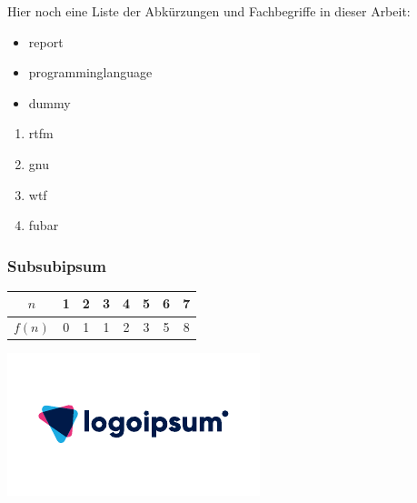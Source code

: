 Hier noch eine Liste der Abkürzungen und Fachbegriffe in dieser Arbeit:

\begin{itemize}
    \item \gls{report}
    \item \gls{programminglanguage}
    \item \gls{dummy}
\end{itemize}

\begin{enumerate}
    \item \acrshort{rtfm}
    \item \acrshort{gnu}
    \item \acrshort{wtf}
    \item \acrshort{fubar}
\end{enumerate}

\lipsum[2-4]

\subsubsection{Subsubipsum}

\begin{table}[h]
    \centering
    \begin{tabular}{c|ccccccc}
        $n$    & 1 & 2 & 3 & 4 & 5 & 6 & 7 \\ \hline
        $f(n)$ & 0 & 1 & 1 & 2 & 3 & 5 & 8 \\
    \end{tabular}
\end{table}

\lipsum[4]

\begin{center}
    \includegraphics[width=\textwidth]{lipsum_logo_1}
\end{center}

